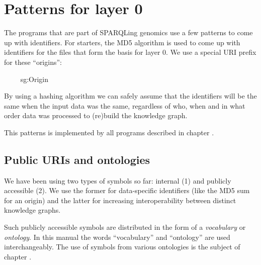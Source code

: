 \section{Patterns for layer 0}

  The programs that are part of SPARQLing genomics use a few patterns to
  come up with identifiers.  For starters, the MD5 algorithm is used to come
  up with identifiers for the files that form the basis for layer 0.  We use
  a special URI prefix for these ``origins'':

  \ \ \ \ 
  {sg:Origin}

  By using a hashing algorithm we can safely assume that the identifiers will
  be the same when the input data was the same, regardless of who, when and
  in what order data was processed to (re)build the knowledge graph.

  This patterns is implemented by all programs described in chapter
  .

\subsection{Public URIs and ontologies}
\label{sec:public-uris-and-ontologies}
  We have been using two types of symbols so far: internal (1) and publicly
  accessible (2).  We use the former for data-specific identifiers (like the
  MD5 sum for an origin) and the latter for increasing interoperability between
  distinct knowledge graphs.

  Such publicly accessible symbols are distributed in the form of a
  \emph{vocabulary} or \emph{ontology}.  In this manual the words ``vocabulary''
  and ``ontology'' are used interchangeably.  The use of symbols from various
  ontologies is the subject of chapter .
